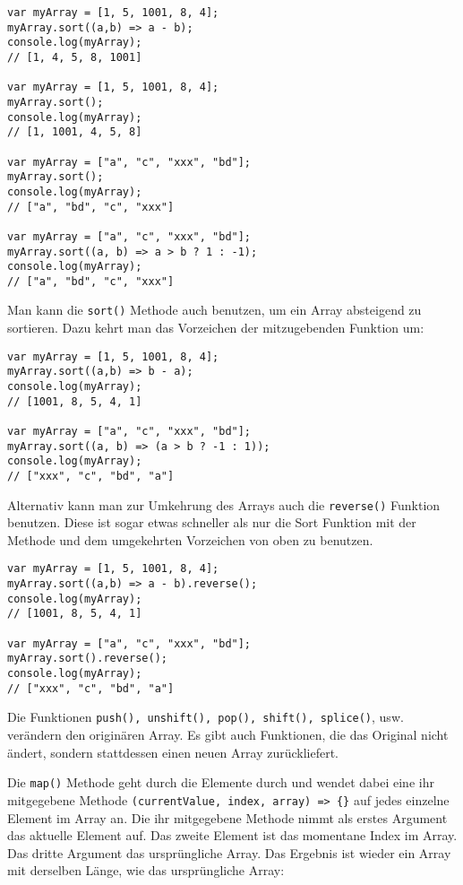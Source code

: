 \documentclass{book}
\begin{document}
\begin{lstlisting}[caption=Array Konstruktor]
var myArray = [1, 5, 1001, 8, 4];
myArray.sort((a,b) => a - b);
console.log(myArray);
// [1, 4, 5, 8, 1001]

var myArray = [1, 5, 1001, 8, 4];
myArray.sort();
console.log(myArray);
// [1, 1001, 4, 5, 8]

var myArray = ["a", "c", "xxx", "bd"];
myArray.sort();
console.log(myArray);
// ["a", "bd", "c", "xxx"]

var myArray = ["a", "c", "xxx", "bd"];
myArray.sort((a, b) => a > b ? 1 : -1);
console.log(myArray);
// ["a", "bd", "c", "xxx"]
\end{lstlisting}

Man kann die \lstinline|sort()| Methode auch benutzen, um ein Array absteigend zu sortieren. Dazu kehrt man das Vorzeichen der mitzugebenden Funktion um:

\begin{lstlisting}[caption=Array Konstruktor]
var myArray = [1, 5, 1001, 8, 4];
myArray.sort((a,b) => b - a);
console.log(myArray);
// [1001, 8, 5, 4, 1]

var myArray = ["a", "c", "xxx", "bd"];
myArray.sort((a, b) => (a > b ? -1 : 1));
console.log(myArray);
// ["xxx", "c", "bd", "a"]
\end{lstlisting}

Alternativ kann man zur Umkehrung des Arrays auch die \lstinline|reverse()| Funktion benutzen. Diese ist sogar etwas schneller als nur die Sort Funktion mit der Methode und dem umgekehrten Vorzeichen von oben zu benutzen.

\begin{lstlisting}[caption=Array Konstruktor]
var myArray = [1, 5, 1001, 8, 4];
myArray.sort((a,b) => a - b).reverse();
console.log(myArray);
// [1001, 8, 5, 4, 1]

var myArray = ["a", "c", "xxx", "bd"];
myArray.sort().reverse();
console.log(myArray);
// ["xxx", "c", "bd", "a"]
\end{lstlisting}

Die Funktionen \lstinline|push(), unshift(), pop(), shift(), splice()|, usw. verändern den originären Array. Es gibt auch Funktionen, die das Original nicht ändert, sondern stattdessen einen neuen Array zurückliefert.

Die \lstinline|map()| Methode geht durch die Elemente durch und wendet dabei eine ihr mitgegebene Methode \lstinline|(currentValue, index, array) => {}| auf jedes einzelne Element im Array an. Die ihr mitgegebene Methode nimmt als erstes Argument das aktuelle Element auf. Das zweite Element ist das momentane Index im Array. Das dritte Argument das ursprüngliche Array. Das Ergebnis ist wieder ein Array mit derselben Länge, wie das ursprüngliche Array:
\end{document}
